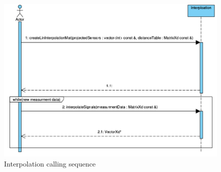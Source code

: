\documentclass[a4paper, 11pt, english, fleqn]{article}
\begin{document}
\begin{figure}[h]
	\begin{center}
		\includegraphics[width=12cm]{figures/interpolation_calling_sequence.png}
		\caption{Interpolation calling sequence}
	\end{center}
\end{figure}

\clearpage
  
\end{document}

